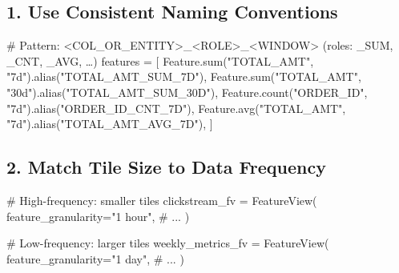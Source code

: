 \documentclass[
  letterpaper,
  DIV=11,
  numbers=noendperiod]{scrreprt}
\newenvironment{Shaded}{\begin{snugshade}}{\end{snugshade}}
\newcommand{\BuiltInTok}[1]{\textcolor[rgb]{0.00,0.23,0.31}{#1}}
\newcommand{\CommentTok}[1]{\textcolor[rgb]{0.37,0.37,0.37}{#1}}
\newcommand{\NormalTok}[1]{\textcolor[rgb]{0.00,0.23,0.31}{#1}}
\newcommand{\OperatorTok}[1]{\textcolor[rgb]{0.37,0.37,0.37}{#1}}
\newcommand{\StringTok}[1]{\textcolor[rgb]{0.13,0.47,0.30}{#1}}
\begin{document}
\hypertarget{use-consistent-naming-conventions}{%
\subsection{1. Use Consistent Naming
Conventions}\label{use-consistent-naming-conventions}}

\begin{Shaded}
\begin{Highlighting}[]
\CommentTok{\# Pattern: \textless{}COL\_OR\_ENTITY\textgreater{}\_\textless{}ROLE\textgreater{}\_\textless{}WINDOW\textgreater{} (roles: \_SUM, \_CNT, \_AVG, …)}
\NormalTok{features }\OperatorTok{=}\NormalTok{ [}
\NormalTok{    Feature.}\BuiltInTok{sum}\NormalTok{(}\StringTok{"TOTAL\_AMT"}\NormalTok{, }\StringTok{"7d"}\NormalTok{).alias(}\StringTok{"TOTAL\_AMT\_SUM\_7D"}\NormalTok{),}
\NormalTok{    Feature.}\BuiltInTok{sum}\NormalTok{(}\StringTok{"TOTAL\_AMT"}\NormalTok{, }\StringTok{"30d"}\NormalTok{).alias(}\StringTok{"TOTAL\_AMT\_SUM\_30D"}\NormalTok{),}
\NormalTok{    Feature.count(}\StringTok{"ORDER\_ID"}\NormalTok{, }\StringTok{"7d"}\NormalTok{).alias(}\StringTok{"ORDER\_ID\_CNT\_7D"}\NormalTok{),}
\NormalTok{    Feature.avg(}\StringTok{"TOTAL\_AMT"}\NormalTok{, }\StringTok{"7d"}\NormalTok{).alias(}\StringTok{"TOTAL\_AMT\_AVG\_7D"}\NormalTok{),}
\NormalTok{]}
\end{Highlighting}
\end{Shaded}

\hypertarget{match-tile-size-to-data-frequency}{%
\subsection{2. Match Tile Size to Data
Frequency}\label{match-tile-size-to-data-frequency}}

\begin{Shaded}
\begin{Highlighting}[]
\CommentTok{\# High{-}frequency: smaller tiles}
\NormalTok{clickstream\_fv }\OperatorTok{=}\NormalTok{ FeatureView(}
\NormalTok{    feature\_granularity}\OperatorTok{=}\StringTok{"1 hour"}\NormalTok{,}
    \CommentTok{\# ...}
\NormalTok{)}

\CommentTok{\# Low{-}frequency: larger tiles}
\NormalTok{weekly\_metrics\_fv }\OperatorTok{=}\NormalTok{ FeatureView(}
\NormalTok{    feature\_granularity}\OperatorTok{=}\StringTok{"1 day"}\NormalTok{,}
    \CommentTok{\# ...}
\NormalTok{)}
\end{Highlighting}
\end{Shaded}
\end{document}
